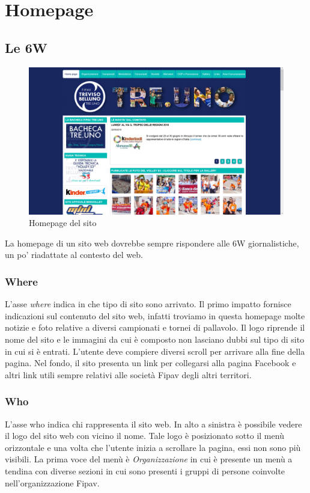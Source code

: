 \section{Homepage}
	\subsection{Le 6W}
	\begin{figure}[H]
	\centering
	\includegraphics[scale=0.5]{Images/homepage.png}
	\caption{Homepage del sito}
	\end{figure}
	
	La homepage di un sito web dovrebbe sempre rispondere alle 6W giornalistiche, 
	un po' riadattate al contesto del web.
	
	\subsubsection{Where}
	L'asse \textit{where} indica in che tipo di sito sono arrivato. Il primo impatto
	fornisce indicazioni sul contenuto del sito web, infatti troviamo in questa 
	homepage molte notizie e foto relative a diversi campionati e tornei di
	pallavolo.
	Il logo riprende il nome del sito e le immagini da cui è composto non lasciano 
	dubbi sul tipo di sito in cui si è entrati. L'utente deve compiere diversi scroll
	per arrivare alla fine della pagina.
	Nel fondo, il sito presenta un link per collegarsi alla pagina Facebook e altri
	link utili sempre relativi alle società Fipav degli altri territori.
	
	\subsubsection{Who}
	L'asse who indica chi rappresenta il sito web. In alto a sinistra è possibile
	vedere il logo del sito web con vicino il nome. Tale logo è posizionato sotto il
	menù orizzontale e una volta che l'utente inizia a scrollare la pagina, essi non
	sono più visibili.
	La prima voce del menù è \textit{Organizzazione} in cui è presente un menù a 
	tendina con diverse sezioni in cui sono presenti i gruppi di persone coinvolte
	nell'organizzazione Fipav.
	

